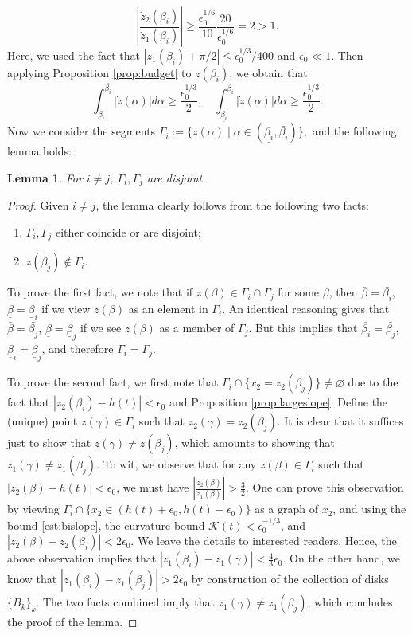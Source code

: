 \documentclass[11pt]{article}
\numberwithin{equation}{section}
\newtheorem{lem}[thm]{Lemma}
\newcommand{\eps}{\epsilon}
\newcommand{\calK}{\mathcal{K}}
\newcommand{\dotz}{\dot{z}}
\begin{document}
\begin{equation}\label{est:bislope}
\left|\frac{\dotz_2(\beta_i)}{\dotz_1(\beta_i)}\right| \ge \frac{\eps_0^{1/6}}{10}\frac{20}{\eps_0^{1/6}} = 2 > 1.
\end{equation}
Here, we used the fact that $|z_1(\beta_i) + \pi/2| \le \eps_0^{1/3}/400$ and $\eps_0 \ll 1$. Then applying Proposition \ref{prop:budget} to $z(\beta_i)$, we obtain that
$$
\int_{\beta_i}^{\bar{\beta_i}} |\dotz(\alpha)| d\alpha \ge \frac{\eps_0^{1/3}}{2},\quad \int^{\beta_i}_{\underline{\beta_i}} |\dotz(\alpha)| d\alpha \ge \frac{\eps_0^{1/3}}{2}.
$$
Now we consider the segments $\Gamma_i := \{z(\alpha)\;|\; \alpha \in (\underline{\beta_i}, \bar{\beta_i})\},$ and the following lemma holds:

\begin{lem}\label{lem:components}
   For $i \neq j$, $\Gamma_i, \Gamma_j$ are disjoint. 
\end{lem} 
\begin{proof}
    Given $i \neq j$, the lemma clearly follows from the following two facts:
    \begin{enumerate}
        \item $\Gamma_i, \Gamma_j$ either coincide or are disjoint;
        \item $z(\beta_j) \not\in \Gamma_i$.
    \end{enumerate}
    To prove the first fact, we note that if $z(\beta) \in \Gamma_i \cap \Gamma_j$ for some $\beta$, then $\bar\beta = \bar{\beta_i}$, $\underline{\beta} = \underline{\beta}_i$ if we view $z(\beta)$ as an element in $\Gamma_i$. An identical reasoning gives that $\bar\beta = \bar{\beta_j}$, $\underline{\beta} = \underline{\beta}_j$ if we see $z(\beta)$ as a member of $\Gamma_j$. But this implies that $\bar{\beta_i} = \bar{\beta_j}$, $\underline{\beta}_i = \underline{\beta}_j$, and therefore $\Gamma_i = \Gamma_j$.

    To prove the second fact, we first note that $\Gamma_i \cap \{x_2 = z_2(\beta_j)\} \neq \varnothing$ due to the fact that $|z_2(\beta_i) - h(t)| < \eps_0$ and Proposition \ref{prop:largeslope}. Define the (unique) point $z(\gamma) \in \Gamma_i$ such that $z_2(\gamma) = z_2(\beta_j)$. It is clear that it suffices just to show that $z(\gamma) \neq z(\beta_j)$, which amounts to showing that $z_1(\gamma) \neq z_1(\beta_j)$. To wit, we observe that for any $z(\beta) \in \Gamma_i$ such that $|z_2(\beta) - h(t)| < \eps_0$, we must have $\left|\frac{\dotz_2(\beta)}{\dotz_1(\beta)}\right| > \frac32$. One can prove this observation by viewing $\Gamma_i \cap \{x_2 \in (h(t) + \eps_0, h(t) - \eps_0)\}$ as a graph of $x_2$, and using the bound \eqref{est:bislope}, the curvature bound $\calK(t) < \eps_0^{-1/3}$, and $|z_2(\beta) - z_2(\beta_i)| < 2\eps_0$. We leave the details to interested readers. Hence, the above observation implies that $|z_1(\beta_i) - z_1(\gamma)| < \frac{4}{3}\eps_0$. On the other hand, we know that $|z_1(\beta_i) - z_1(\beta_j)| > 2\eps_0$ by construction of the collection of disks $\{B_k\}_k$. The two facts combined imply that $z_1(\gamma) \neq z_1(\beta_j)$, which concludes the proof of the lemma.
\end{proof}
\end{document}
